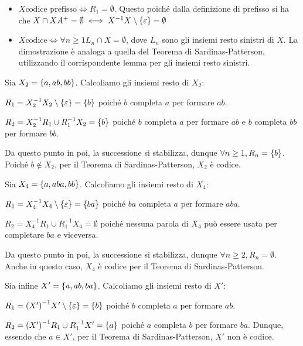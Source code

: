 \begin{note}[Osservazioni]
  \begin{itemize}
    \item \(X \text{codice prefisso} \iff R_1 = \emptyset\).
      Questo poiché dalla definizione di prefisso si ha che \(X \cap XA^+ = \emptyset \iff X^{-1}X \setminus \set{\varepsilon} = \emptyset\)
    \item \(X \text{codice} \iff \forall n \geq 1 L_n \cap X = \emptyset\),
      dove \(L_n\) sono gli insiemi resto sinistri di \(X\).
      La dimostrazione è analoga a quella del Teorema di Sardinas-Patterson, utilizzando il corrispondente lemma per gli insiemi resto sinistri.
  \end{itemize}
\end{note}

\begin{example}
  Sia \(X_2 = \set{a,ab,bb}\). Calcoliamo gli insiemi resto di \(X_2\):

  \(R_1 = X_2^{-1}X_2 \setminus \set{\varepsilon} = \set{b}\)
  poiché \(b\) completa \(a\) per formare \(ab\).

  \(R_2 = X_2^{-1}R_1 \cup R_1^{-1}X_2 = \set{b}\)
  poiché \(b\) completa \(a\) per formare \(ab\) e \(b\) completa \(bb\) per formare \(bb\).

  Da questo punto in poi, la successione si stabilizza, dunque \(\forall n \geq 1, R_n = \set{b}\).
  Poiché \(b \not\in X_2\), per il Teorema di Sardinas-Patterson, \(X_2\) è codice.

  Sia \(X_4 = \set{a,aba,bb}\). Calcoliamo gli insiemi resto di \(X_4\):
  
  \(R_1 = X_4^{-1}X_4 \setminus \set{\varepsilon} = \set{ba}\)
  poiché \(ba\) completa \(a\) per formare \(aba\).

  \(R_2 = X_4^{-1}R_1 \cup R_1^{-1}X_4 = \emptyset\)
  poiché nessuna parola di \(X_4\) può essere usata per completare \(ba\) e viceversa.
  
  Da questo punto in poi, la successione si stabilizza, dunque \(\forall n \geq 2, R_n = \emptyset\).
  Anche in questo caso, \(X_4\) è codice per il Teorema di Sardinas-Patterson.

  Sia infine \(X' = \set{a,ab,ba}\). Calcoliamo gli insiemi resto di \(X'\):

  \(R_1 = {(X')}^{-1}X' \setminus \set{\varepsilon} = \set{b}\)
  poiché \(b\) completa \(a\) per formare \(ab\).
  
  \(R_2 = {(X')}^{-1}R_1 \cup R_1^{-1}X' = \set{a}\)
  poiché \(a\) completa \(b\) per formare \(ba\).
  Dunque, essendo che \(a \in X'\), per il Teorema di Sardinas-Patterson, \(X'\) non è codice.
\end{example}

